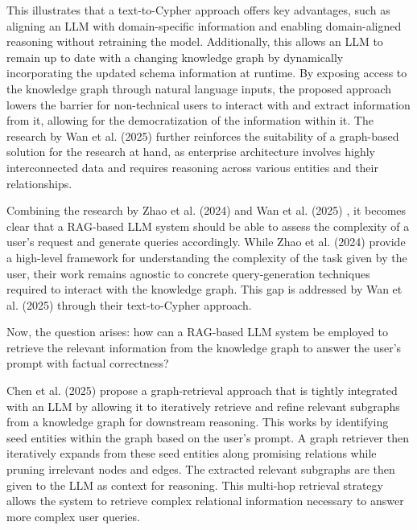 This illustrates that a text-to-Cypher approach offers key advantages, such as aligning an LLM with domain-specific information and enabling domain-aligned reasoning without retraining the model. Additionally, this allows an LLM to remain up to date with a changing knowledge graph by dynamically incorporating the updated schema information at runtime. By exposing access to the knowledge graph through natural language inputs, the proposed approach lowers the barrier for non-technical users to interact with and extract information from it, allowing for the democratization of the information within it. The research by Wan et al. (2025) \cite{wan2025prompting} further reinforces the suitability of a graph-based solution for the research at hand, as enterprise architecture involves highly interconnected data and requires reasoning across various entities and their relationships. 



Combining the research by Zhao et al. (2024) \cite{zhao2024retrieval} and Wan et al. (2025) \cite{wan2025prompting}, it becomes clear that a RAG-based LLM system should be able to assess the complexity of a user's request and generate queries accordingly. While Zhao et al. (2024) \cite{zhao2024retrieval} provide a high-level framework for understanding the complexity of the task given by the user, their work remains agnostic to concrete query-generation techniques required to interact with the knowledge graph. This gap is addressed by Wan et al. (2025) \cite{wan2025prompting} through their text-to-Cypher approach.

Now, the question arises: how can a RAG-based LLM system be employed to retrieve the relevant information from the knowledge graph to answer the user's prompt with factual correctness?



Chen et al. (2025) \cite{chen2025gril} propose a graph-retrieval approach that is tightly integrated with an LLM by allowing it to iteratively retrieve and refine relevant subgraphs from a knowledge graph for downstream reasoning. This works by identifying seed entities within the graph based on the user's prompt. A graph retriever then iteratively expands from these seed entities along promising relations while pruning irrelevant nodes and edges. The extracted relevant subgraphs are then given to the LLM as context for reasoning. This multi-hop retrieval strategy allows the system to retrieve complex relational information necessary to answer more complex user queries.

